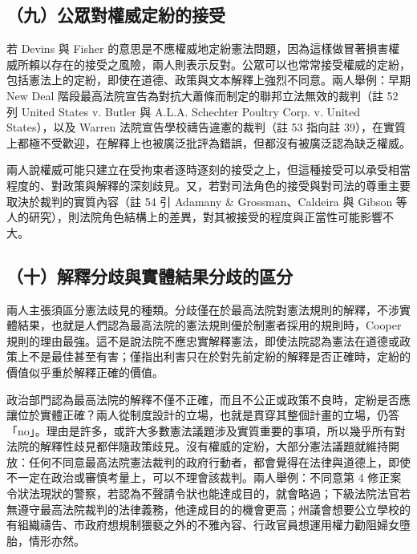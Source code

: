 \subsection{（九）公眾對權威定紛的接受}

若 Devins 與 Fisher 的意思是不應權威地定紛憲法問題，因為這樣做冒著損害權威所賴以存在的接受之風險，兩人則表示反對。公眾可以也常常接受權威的定紛，包括憲法上的定紛，即使在道德、政策與文本解釋上強烈不同意。兩人舉例：早期 New Deal 階段最高法院宣告為對抗大蕭條而制定的聯邦立法無效的裁判（註 52 列 United States v. Butler 與 A.L.A. Schechter Poultry Corp. v. United States），以及 Warren 法院宣告學校禱告違憲的裁判（註 53 指向註 39），在實質上都極不受歡迎，在解釋上也被廣泛批評為錯誤，但都沒有被廣泛認為缺乏權威。

兩人說權威可能只建立在受拘束者逐時逐刻的接受之上，但這種接受可以承受相當程度的、對政策與解釋的深刻歧見。又，若對司法角色的接受與對司法的尊重主要取決於裁判的實質內容（註 54 引 Adamany \& Grossman、Caldeira 與 Gibson 等人的研究），則法院角色結構上的差異，對其被接受的程度與正當性可能影響不大。

\subsection{（十）解釋分歧與實體結果分歧的區分}

兩人主張須區分憲法歧見的種類。分歧僅在於最高法院對憲法規則的解釋，不涉實體結果，也就是人們認為最高法院的憲法規則優於制憲者採用的規則時，Cooper 規則的理由最強。這不是說法院不應忠實解釋憲法，即使法院認為憲法在道德或政策上不是最佳甚至有害；僅指出利害只在於對先前定紛的解釋是否正確時，定紛的價值似乎重於解釋正確的價值。

政治部門認為最高法院的解釋不僅不正確，而且不公正或政策不良時，定紛是否應讓位於實體正確？兩人從制度設計的立場，也就是貫穿其整個計畫的立場，仍答「no」。理由是許多，或許大多數憲法議題涉及實質重要的事項，所以幾乎所有對法院的解釋性歧見都伴隨政策歧見。沒有權威的定紛，大部分憲法議題就維持開放：任何不同意最高法院憲法裁判的政府行動者，都會覺得在法律與道德上，即使不一定在政治或審慎考量上，可以不理會該裁判。兩人舉例：不同意第 4 修正案令狀法現狀的警察，若認為不聲請令狀也能達成目的，就會略過；下級法院法官若無遵守最高法院裁判的法律義務，他達成目的的機會更高；州議會想要公立學校的有組織禱告、市政府想規制猥褻之外的不雅內容、行政官員想運用權力勸阻婦女墮胎，情形亦然。

